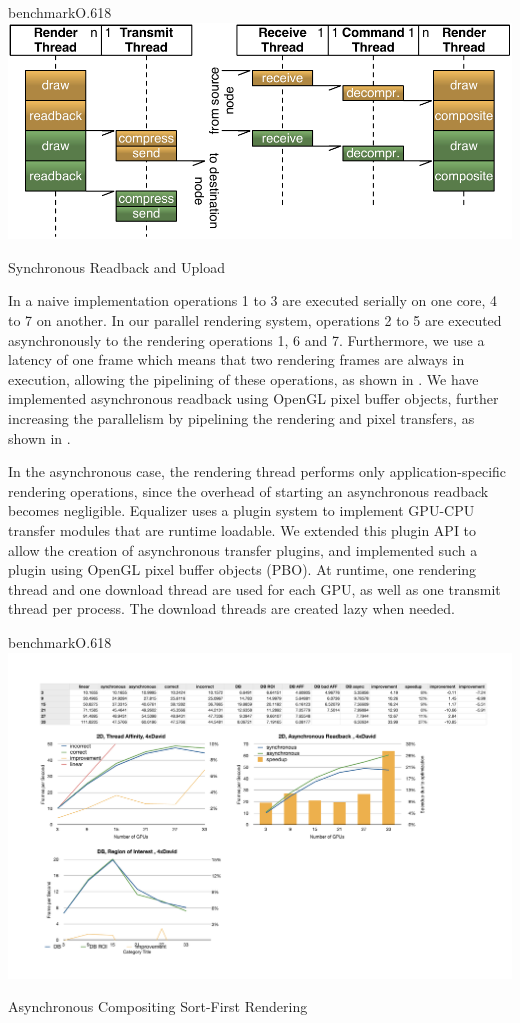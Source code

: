 \begin{wrapfloat}{benchmark}{O}{.618\textwidth}
 \includegraphics[width=.618\textwidth]{images/syncReadback}
 {\caption{\label{fSyncRB}Synchronous Readback and Upload}}
\end{wrapfloat}

In a naive implementation operations 1 to 3 are executed serially on one
core, 4 to 7 on another. In our parallel rendering system, operations 2
to 5 are executed asynchronously to the rendering operations 1, 6 and 7.
Furthermore, we use a latency of one frame which means that two rendering frames
are always in execution, allowing the pipelining of these operations, as shown
in . We have implemented asynchronous readback using OpenGL pixel
buffer objects, further increasing the parallelism by pipelining the rendering
and pixel transfers, as shown in .

In the asynchronous case, the rendering thread performs only
application-specific rendering operations, since the overhead of starting an
asynchronous readback becomes negligible. Equalizer uses a plugin system to
implement GPU-CPU transfer modules that are runtime loadable. We extended this
plugin API to allow the creation of asynchronous transfer plugins, and
implemented such a plugin using OpenGL pixel buffer objects (PBO). At runtime,
one rendering thread and one download thread are used for each GPU, as well as
one transmit thread per process. The download threads are created lazy when
needed.

\begin{wrapfloat}{benchmark}{O}{.618\textwidth}
 \includegraphics[width=.618\textwidth]{results/async}
 {\caption{\label{rAsync}Asynchronous Compositing Sort-First Rendering}}
\end{wrapfloat}

